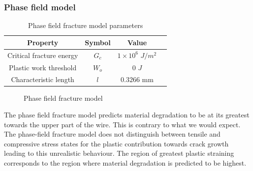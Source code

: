 \documentclass[sn-mathphys,Numbered,draft]{sn-jnl}%
\begin{document}
\FloatBarrier

\subsubsection{Phase field model}

\begin{table}[htb]
	\centering
		\begin{tabular}{cccc} \hline
			Property & Symbol & Value  \\ \hline 
			Critical fracture energy & $G_c$ & $1\times10^6$ $J/m^2$ \\
   		Plastic work threshold & $W_o$ & $0$ $J$ \\
			Characteristic length & $l$ & $0.3266$ mm   \\
			\hline
		\end{tabular}
	\caption{Phase field fracture model parameters}
	\label{tab:material_properties}
\end{table}

\begin{figure}[t!]
	\centering
	  \qquad
		\caption{Phase field fracture model}
	\label{label_for_entire_figure}
\end{figure}
\FloatBarrier

The phase field fracture model predicts material degradation to be at its greatest towards the upper part of the wire. This is contrary to what we would expect. The phase-field fracture model does not distinguish between tensile and compressive stress states for the plastic contribution towards crack growth leading to this unrealistic behaviour. The region of greatest plastic straining corresponds to the region where material degradation is predicted to be highest.
\end{document}

